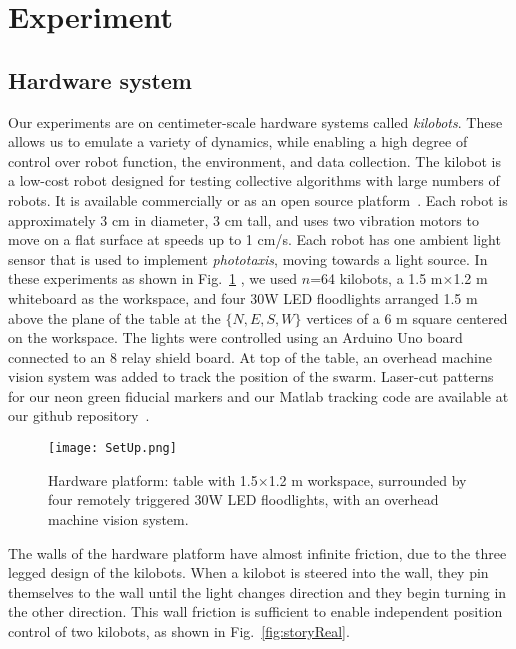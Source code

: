 
\section{Experiment}\label{sec:expResults}



\subsection{Hardware system}


Our experiments are on centimeter-scale hardware systems called \emph{kilobots}.  These allows us to emulate a variety of dynamics, while enabling a high degree of control over robot function, the environment, and data collection. The kilobot \cite{Rubenstein2012,rubenstein2014programmable} is a low-cost robot designed for testing collective algorithms with large numbers of robots. It is available commercially or as an open source platform~\cite{K-Team2015}.  Each robot is approximately 3 cm in diameter, 3 cm tall, and uses two vibration motors to move on a flat surface at speeds up to 1 cm/s.  Each robot has one ambient light sensor that is used to implement \emph{phototaxis},  moving towards a light source. 
In these experiments as shown in Fig.~\ref{fig:setup} , we used $n$=64 kilobots, a 1.5 m$\times$1.2 m whiteboard as the workspace, and four 30W LED floodlights arranged 1.5 m above the plane of the table at the $\{N,E,S,W\}$ vertices of a 6 m square centered on the workspace. The lights were controlled using an Arduino Uno board connected to an 8 relay shield board.  At top of the table, an overhead machine vision system was added to track the position of the swarm. Laser-cut patterns for our neon green fiducial markers and our {\sc Matlab} tracking code are available at our github repository~\cite{Shahrokhi2015GitHubShapeControl}.


\begin{figure}
\begin{center}
	\texttt{[image: SetUp.png]}
\end{center}
\caption{\label{fig:setup}
Hardware platform:  table with 1.5$\times$1.2 m workspace, surrounded by four remotely triggered 30W LED floodlights, with an overhead machine vision system.
}
\end{figure}

The walls of the hardware platform have almost infinite friction, due to the three legged design of the kilobots. When a kilobot is steered into the wall, they pin themselves to the wall until the light changes direction and they begin turning in the other direction.  This wall friction is sufficient to enable independent position control of two kilobots, as shown in Fig.~\ref{fig:storyReal}.



